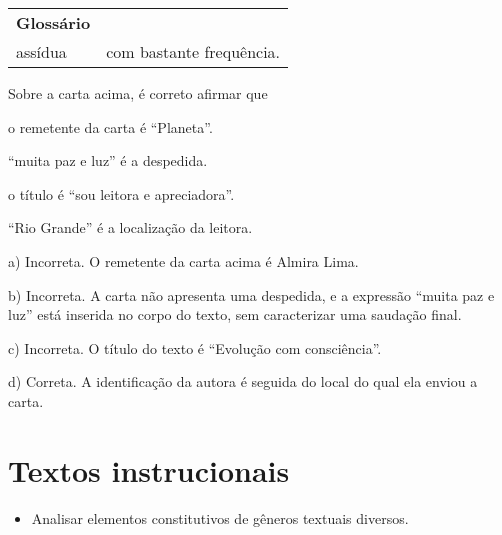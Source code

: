 \begin{escolha}
\begin{tabular}{ll}
\textbf{Glossário} & \mbox{}\\
assídua & com bastante frequência.\\
\end{tabular}

Sobre a carta acima, é correto afirmar que 

\begin{escolha}
\item o remetente da carta é ``Planeta''.

\item ``muita paz e luz'' é a despedida.

\item o título é ``sou leitora e apreciadora''.

\item ``Rio Grande'' é a localização da leitora.
\end{escolha}


a) Incorreta. O remetente da carta acima é Almira Lima.

b)  Incorreta. A carta não apresenta uma despedida, e a expressão ``muita 
paz e luz'' está inserida no corpo do texto, sem caracterizar uma 
saudação final. 

c) Incorreta. O título do texto é ``Evolução com consciência''.

d) Correta. A identificação da autora é seguida do local do qual ela
enviou a carta.

\chapter{Textos instrucionais}



\begin{itemize}
\item Analisar elementos constitutivos de gêneros textuais diversos.


\end{itemize}
\end{escolha}
